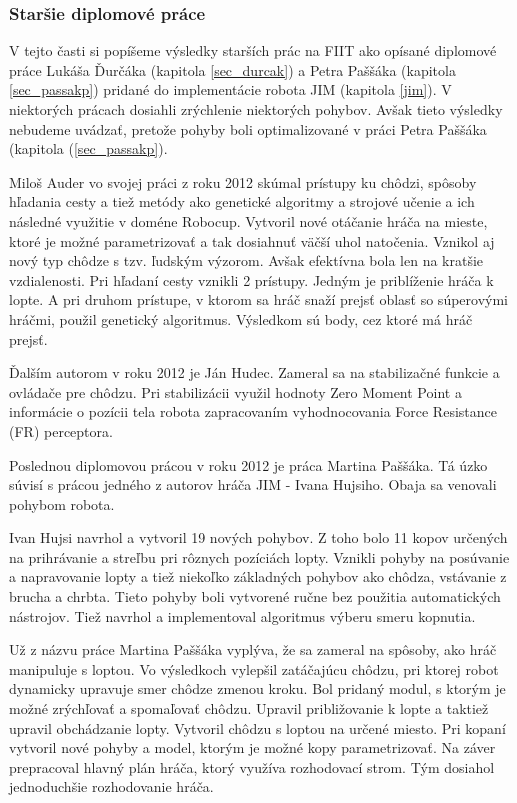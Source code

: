 \subsubsection{Staršie diplomové práce}\label{sec_auder_hudec}

V tejto časti si popíšeme výsledky starších prác na FIIT ako opísané diplomové práce Lukáša Ďurčáka (kapitola \ref{sec_durcak}) a Petra Paššáka (kapitola \ref{sec_passakp}) pridané do implementácie robota JIM (kapitola \ref{jim}). V niektorých prácach dosiahli zrýchlenie niektorých pohybov. Avšak tieto výsledky nebudeme uvádzať, pretože pohyby boli optimalizované v práci Petra Paššáka (kapitola (\ref{sec_passakp}).

Miloš Auder vo svojej práci\cite{auder} z roku 2012 skúmal prístupy ku chôdzi, spôsoby hľadania cesty a tiež metódy ako genetické algoritmy a strojové učenie a ich následné využitie v doméne Robocup. Vytvoril nové otáčanie hráča na mieste, ktoré je možné parametrizovať a tak dosiahnuť väčší uhol natočenia. Vznikol aj nový typ chôdze s tzv. ľudským výzorom. Avšak efektívna bola len na kratšie vzdialenosti. Pri hľadaní cesty vznikli 2 prístupy. Jedným je priblíženie hráča k lopte. A pri druhom prístupe, v ktorom sa hráč snaží prejsť oblasť so súperovými hráčmi, použil genetický algoritmus. Výsledkom sú body, cez ktoré má hráč prejsť.

Ďalším autorom v roku 2012 je Ján Hudec\cite{hudec}. Zameral sa na stabilizačné funkcie a ovládače pre chôdzu. Pri stabilizácii využil hodnoty Zero Moment Point a informácie o pozícii tela robota zapracovaním vyhodnocovania Force Resistance (FR) perceptora.

Poslednou diplomovou prácou v roku 2012 je práca Martina Paššáka. Tá úzko súvisí s prácou jedného z autorov hráča JIM - Ivana Hujsiho. Obaja sa venovali pohybom robota. 

Ivan Hujsi\cite{Hujsi} navrhol a vytvoril 19 nových pohybov. Z toho bolo 11 kopov určených na prihrávanie a streľbu pri rôznych pozíciách lopty. Vznikli pohyby na posúvanie a napravovanie lopty a tiež niekoľko základných pohybov ako chôdza, vstávanie z brucha a chrbta. Tieto pohyby boli vytvorené ručne bez použitia automatických nástrojov. Tiež navrhol a implementoval algoritmus výberu smeru kopnutia.

Už z názvu práce Martina Paššáka\cite{passak_martin} vyplýva, že sa zameral na spôsoby, ako hráč manipuluje s loptou. Vo výsledkoch vylepšil zatáčajúcu chôdzu, pri ktorej robot dynamicky upravuje smer chôdze zmenou kroku. Bol pridaný modul, s ktorým je možné zrýchľovať a spomaľovať chôdzu. Upravil približovanie k lopte a taktiež upravil obchádzanie lopty. Vytvoril chôdzu s loptou na určené miesto. Pri kopaní vytvoril nové pohyby a model, ktorým je možné kopy parametrizovať. Na záver prepracoval hlavný plán hráča, ktorý využíva rozhodovací strom. Tým dosiahol jednoduchšie rozhodovanie hráča.